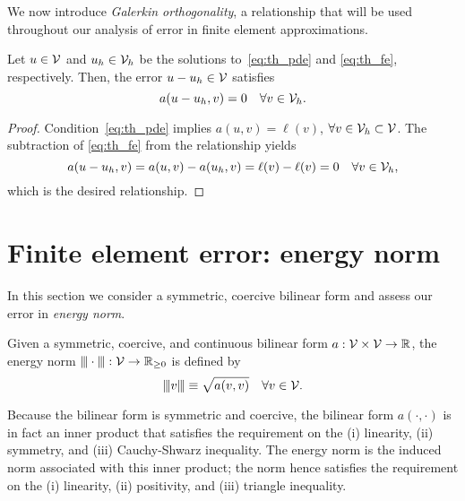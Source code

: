 We now introduce \emph{Galerkin orthogonality}, a relationship that will be used throughout our analysis of error in finite element approximations.
\begin{lemma}
  Let $u \in \mathcal{V}$ and $u_h \in \mathcal{V}_h$ be the solutions to~\eqref{eq:th_pde} and \eqref{eq:th_fe}, respectively.  Then, the error $u - u_h \in \mathcal{V}$ satisfies 
  \begin{equation*}
    a(u - u_h, v) = 0 \quad \forall v \in \mathcal{V}_h.
  \end{equation*}
  \begin{proof}
    Condition~\eqref{eq:th_pde} implies $a(u,v) = \ell(v)$, $\forall v \in \mathcal{V}_h \subset \mathcal{V}$.  The subtraction of \eqref{eq:th_fe} from the relationship yields
    \begin{equation*}
      a(u - u_h, v) = a(u,v) - a(u_h,v) = \ell(v) - \ell(v) = 0 \quad \forall v \in \mathcal{V}_h,
    \end{equation*}
    which is the desired relationship.
  \end{proof}
\end{lemma}


\section{Finite element error: energy norm}
In this section we consider a symmetric, coercive bilinear form and assess our error in \emph{energy norm}.
\begin{definition}
  Given a symmetric, coercive, and continuous bilinear form $a: \mathcal{V} \times \mathcal{V} \to \mathbb{R}$, the energy norm $|\kern-1pt|\kern-1pt| \cdot |\kern-1pt|\kern-1pt| : \mathcal{V} \to \mathbb{R}_{\geq 0}$ is defined by
  \begin{equation*}
    |\kern-1pt|\kern-1pt| v |\kern-1pt|\kern-1pt| \equiv \sqrt{a(v,v)} \quad \forall v \in \mathcal{V}.
  \end{equation*}
\end{definition}
Because the bilinear form is symmetric and coercive, the bilinear form $a(\cdot,\cdot)$ is in fact an inner product that satisfies the requirement on the (i) linearity, (ii) symmetry, and (iii) Cauchy-Shwarz inequality.  The energy norm is the induced norm associated with this inner product; the norm hence satisfies the requirement on the (i) linearity, (ii) positivity, and (iii) triangle inequality.

